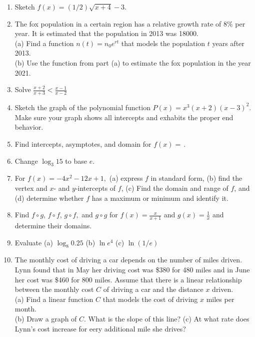\documentclass[11pt]{article}
\begin{document}
\begin{enumerate}
\item Sketch $f(x)=(1/2)\sqrt{x+4}-3.$
\item The fox population in a certain region has a relative growth rate of $8\%$ per year. It is estimated that the population in 2013 was 18000. \\
(a) Find a function $n(t)=n_0e^{rt}$ that models the population $t$ years after 2013.\\
(b) Use the function from part (a) to estimate the fox population in the year 2021.\\
\item Solve $\frac{x+2}{x+3} < \frac{x-1}{x-2}$

\item Sketch the graph of the polynomial function $P(x)=x^3(x+2)(x-3)^2 $. Make sure your graph shows all intercepts and exhabits the proper end behavior.

\item Find intercepts, asymptotes, and domain for $f(x)=\frac{}{}.$

\item Change $\log_3 15$ to base $e.$

\item For $f(x)=-4x^2-12x+1,$ (a) express $f$ in standard form, (b) find the vertex and $x$- and $y$-intercepts of $f$, (c) Find the domain and range of $f$, and (d) determine whether $f$ has a maximum or minimum and identify it.

\item Find $f \circ g$, $f \circ f$, $g\circ f,$ and $g \circ g$ for $f(x)=\frac{x}{x+1}$ and $g(x)=\frac{1}{x}$ and determine their domains.

\item Evaluate (a) $\log_8 0.25 $ (b) $\ln e^4 $ (c) $\ln (1/e) $

\item The monthly cost of driving a car depends on the number of miles driven. Lynn found that in May her driving cost was \$380 for 480 miles and in June her cost was \$460 for 800 miles. Assume that there is a linear relationship between the monthly cost $C$ of driving a car and the distance $x$ driven.\\
(a) Find a linear function $C$ that models the cost of driving $x$ miles per month.\\
(b) Draw a graph of $C.$ What is the slope of this line?
(c) At what rate does Lynn's cost increase for eery additional mile she drives?\\


\end{enumerate}
\end{document}

